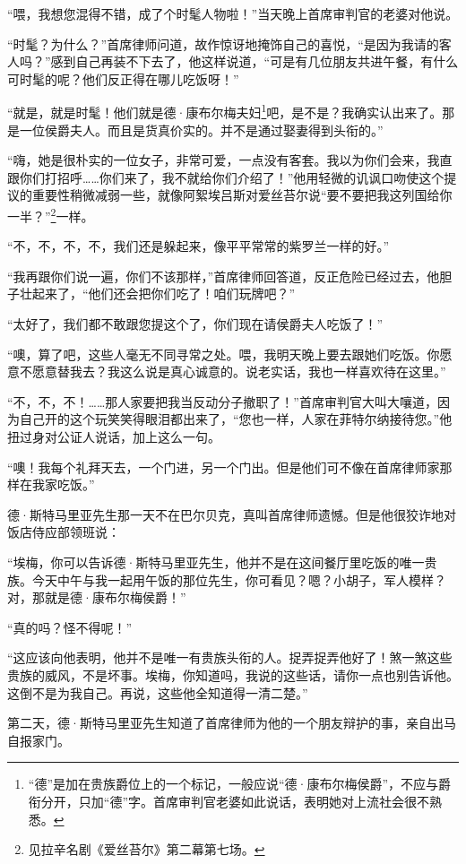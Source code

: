 \par “喂，我想您混得不错，成了个时髦人物啦！”当天晚上首席审判官的老婆对他说。
\par “时髦？为什么？”首席律师问道，故作惊讶地掩饰自己的喜悦，“是因为我请的客人吗？”感到自己再装不下去了，他这样说道，“可是有几位朋友共进午餐，有什么可时髦的呢？他们反正得在哪儿吃饭呀！”
\par “就是，就是时髦！他们就是德·康布尔梅夫妇\footnote{“德”是加在贵族爵位上的一个标记，一般应说“德·康布尔梅侯爵”，不应与爵衔分开，只加“德”字。首席审判官老婆如此说话，表明她对上流社会很不熟悉。}吧，是不是？我确实认出来了。那是一位侯爵夫人。而且是货真价实的。并不是通过娶妻得到头衔的。”
\par “嗨，她是很朴实的一位女子，非常可爱，一点没有客套。我以为你们会来，我直跟你们打招呼……你们来了，我不就给你们介绍了！”他用轻微的讥讽口吻使这个提议的重要性稍微减弱一些，就像阿絮埃吕斯对爱丝苔尔说“要不要把我这列国给你一半？”\footnote{见拉辛名剧《爱丝苔尔》第二幕第七场。}一样。
\par “不，不，不，不，我们还是躲起来，像平平常常的紫罗兰一样的好。”
\par “我再跟你们说一遍，你们不该那样，”首席律师回答道，反正危险已经过去，他胆子壮起来了，“他们还会把你们吃了！咱们玩牌吧？”
\par “太好了，我们都不敢跟您提这个了，你们现在请侯爵夫人吃饭了！”
\par “噢，算了吧，这些人毫无不同寻常之处。喂，我明天晚上要去跟她们吃饭。你愿意不愿意替我去？我这么说是真心诚意的。说老实话，我也一样喜欢待在这里。”
\par “不，不，不！……那人家要把我当反动分子撤职了！”首席审判官大叫大嚷道，因为自己开的这个玩笑笑得眼泪都出来了，“您也一样，人家在菲特尔纳接待您。”他扭过身对公证人说话，加上这么一句。
\par “噢！我每个礼拜天去，一个门进，另一个门出。但是他们可不像在首席律师家那样在我家吃饭。”
\par 德·斯特马里亚先生那一天不在巴尔贝克，真叫首席律师遗憾。但是他很狡诈地对饭店侍应部领班说：
\par “埃梅，你可以告诉德·斯特马里亚先生，他并不是在这间餐厅里吃饭的唯一贵族。今天中午与我一起用午饭的那位先生，你可看见？嗯？小胡子，军人模样？对，那就是德·康布尔梅侯爵！”
\par “真的吗？怪不得呢！”
\par “这应该向他表明，他并不是唯一有贵族头衔的人。捉弄捉弄他好了！煞一煞这些贵族的威风，不是坏事。埃梅，你知道吗，我说的这些话，请你一点也别告诉他。这倒不是为我自己。再说，这些他全知道得一清二楚。”
\par 第二天，德·斯特马里亚先生知道了首席律师为他的一个朋友辩护的事，亲自出马自报家门。
